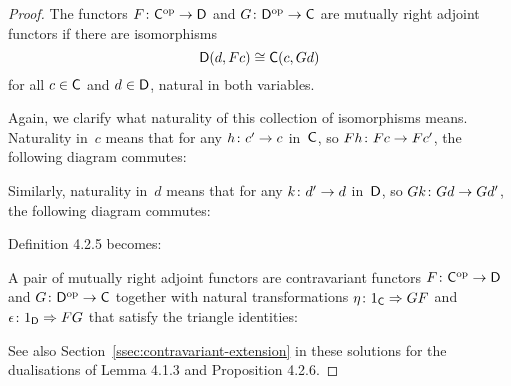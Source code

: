 \documentclass[../../solutions]{subfiles}
\begin{document}
\begin{proof}
  The functors ${F}\colon{{\mathsf{C}}^{\mathrm{op}}}\to{{\mathsf{D}}}$ and ${G}\colon{{\mathsf{D}}^{\mathrm{op}}}\to{{\mathsf{C}}}$
  are mutually right adjoint functors if there are isomorphisms
  $${\mathsf{D}}(d,Fc)\cong {\mathsf{C}}(c,Gd)$$
  for all $c\in{\mathsf{C}}$ and $d\in{\mathsf{D}}$, natural in both variables.

  Again, we clarify what naturality of this collection of isomorphisms
  means.  Naturality in~$c$ means that for any ${h}\colon{c'}\to{c}$
  in~${\mathsf{C}}$, so ${Fh}\colon{Fc}\to{Fc'}$, the following diagram commutes:
  \begin{center}
  \end{center}
  Similarly, naturality in~$d$ means that for any ${k}\colon{d'}\to{d}$
  in~${\mathsf{D}}$, so ${Gk}\colon{Gd}\to{Gd'}$, the following diagram commutes:
  \begin{center}
  \end{center}

  Definition 4.2.5 becomes:
  \begingroup
  \renewcommand{\theHtheorem}{\theHsection.\arabic{theorem}.right}
  \begin{definition}
    A pair of mutually right adjoint functors are contravariant
    functors ${F}\colon{{\mathsf{C}}^{\mathrm{op}}}\to{{\mathsf{D}}}$ and ${G}\colon{{\mathsf{D}}^{\mathrm{op}}}\to{{\mathsf{C}}}$
    together with natural transformations
    ${\eta}\colon{1_{\mathsf{C}}}\Rightarrow{GF}$ and ${\epsilon}\colon{1_{\mathsf{D}}}\Rightarrow{FG}$ that
    satisfy the triangle identities:
    \begin{center}
    \end{center}
  \end{definition}
  \popthm
  \endgroup

  See also Section~\ref{ssec:contravariant-extension} in these
  solutions for the dualisations of Lemma 4.1.3 and Proposition 4.2.6.
\end{proof}
\end{document}
